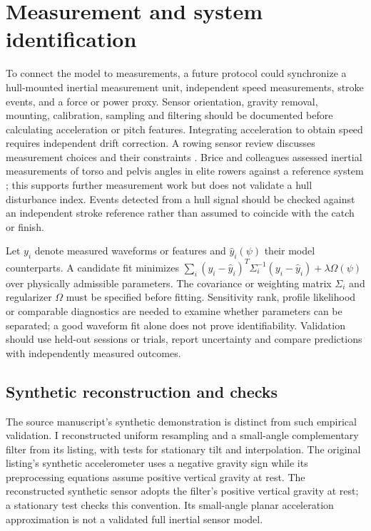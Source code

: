 \documentclass[11pt]{article}
\begin{document}
\section{Measurement and system identification}
To connect the model to measurements, a future protocol could synchronize a hull-mounted inertial measurement unit, independent speed measurements, stroke events, and a force or power proxy. Sensor orientation, gravity removal, mounting, calibration, sampling and filtering should be documented before calculating acceleration or pitch features. Integrating acceleration to obtain speed requires independent drift correction. A rowing sensor review discusses measurement choices and their constraints \cite{worsey}. Brice and colleagues assessed inertial measurements of torso and pelvis angles in elite rowers against a reference system \cite{brice}; this supports further measurement work but does not validate a hull disturbance index. Events detected from a hull signal should be checked against an independent stroke reference rather than assumed to coincide with the catch or finish.

Let $y_i$ denote measured waveforms or features and $\hat y_i(\psi)$ their model counterparts. A candidate fit minimizes $\sum_i (y_i-\hat y_i)^T\Sigma_i^{-1}(y_i-\hat y_i)+\lambda\Omega(\psi)$ over physically admissible parameters. The covariance or weighting matrix $\Sigma_i$ and regularizer $\Omega$ must be specified before fitting. Sensitivity rank, profile likelihood or comparable diagnostics are needed to examine whether parameters can be separated; a good waveform fit alone does not prove identifiability. Validation should use held-out sessions or trials, report uncertainty and compare predictions with independently measured outcomes. 
\subsection{Synthetic reconstruction and checks}
The source manuscript's synthetic demonstration is distinct from such empirical validation. I reconstructed uniform resampling and a small-angle complementary filter from its listing, with tests for stationary tilt and interpolation. The original listing's synthetic accelerometer uses a negative gravity sign while its preprocessing equations assume positive vertical gravity at rest. The reconstructed synthetic sensor adopts the filter's positive vertical gravity at rest; a stationary test checks this convention. Its small-angle planar acceleration approximation is not a validated full inertial sensor model. 
\end{document}
